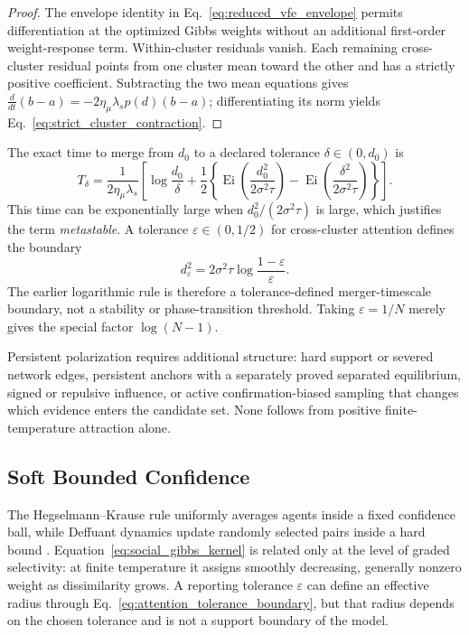 \documentclass[12pt]{article}
\begin{document}
\begin{proof}
The envelope identity in Eq.~\eqref{eq:reduced_vfe_envelope} permits differentiation at the optimized Gibbs weights without an additional first-order weight-response term.  Within-cluster residuals vanish.  Each remaining cross-cluster residual points from one cluster mean toward the other and has a strictly positive coefficient.  Subtracting the two mean equations gives
$\frac{d}{dt}(b-a)=-2\eta_\mu\lambda_s p(d)(b-a)$; differentiating its norm yields Eq.~\eqref{eq:strict_cluster_contraction}.
\end{proof}

The exact time to merge from $d_0$ to a declared tolerance $\delta\in(0,d_0)$ is
\begin{equation}
T_\delta
=\frac{1}{2\eta_\mu\lambda_s}
\left[
\log\frac{d_0}{\delta}
+\frac12\left\{\operatorname{Ei}\!\left(\frac{d_0^2}{2\sigma^2\tau}\right)
-\operatorname{Ei}\!\left(\frac{\delta^2}{2\sigma^2\tau}\right)\right\}
\right].
\label{eq:tolerance_merger_time}
\end{equation}
This time can be exponentially large when $d_0^2/(2\sigma^2\tau)$ is large, which justifies the term \emph{metastable}.  A tolerance $\varepsilon\in(0,1/2)$ for cross-cluster attention defines the boundary
\begin{equation}
d_\varepsilon^2
=2\sigma^2\tau\log\frac{1-\varepsilon}{\varepsilon}.
\label{eq:attention_tolerance_boundary}
\end{equation}
The earlier logarithmic rule is therefore a tolerance-defined merger-timescale boundary, not a stability or phase-transition threshold.  Taking $\varepsilon=1/N$ merely gives the special factor $\log(N-1)$.

Persistent polarization requires additional structure: hard support or severed network edges, persistent anchors with a separately proved separated equilibrium, signed or repulsive influence, or active confirmation-biased sampling that changes which evidence enters the candidate set.  None follows from positive finite-temperature attraction alone.


\subsection{Soft Bounded Confidence}

The Hegselmann--Krause rule uniformly averages agents inside a fixed confidence ball, while Deffuant dynamics update randomly selected pairs inside a hard bound \citep{hegselmann2002opinion,deffuant2000}.  Equation~\eqref{eq:social_gibbs_kernel} is related only at the level of graded selectivity: at finite temperature it assigns smoothly decreasing, generally nonzero weight as dissimilarity grows.  A reporting tolerance $\varepsilon$ can define an effective radius through Eq.~\eqref{eq:attention_tolerance_boundary}, but that radius depends on the chosen tolerance and is not a support boundary of the model.
\end{document}
